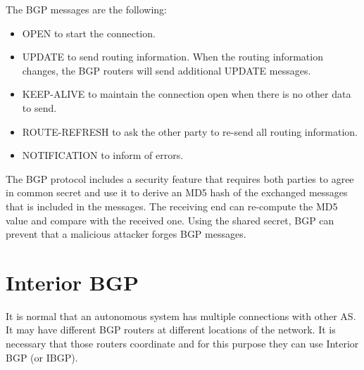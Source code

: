 The BGP messages are the following:
\begin{itemize}
\item OPEN to start the connection.
\item UPDATE to send routing information. When the routing information changes, the BGP routers will send additional UPDATE messages.
\item KEEP-ALIVE to maintain the connection open when there is no other data to send.
\item ROUTE-REFRESH to ask the other party to re-send all routing information.
\item NOTIFICATION to inform of errors.
\end{itemize}

The BGP protocol includes a security feature that requires both parties to agree in common secret and use it to derive an MD5 hash of the exchanged messages that is included in the messages.
The receiving end can re-compute the MD5 value and compare with the received one.
Using the shared secret, BGP can prevent that a malicious attacker forges BGP messages.

\section{Interior BGP}

It is normal that an autonomous system has multiple connections with other AS.
It may have different BGP routers at different locations of the network.
It is necessary that those routers coordinate and for this purpose they can use Interior BGP (or IBGP).


